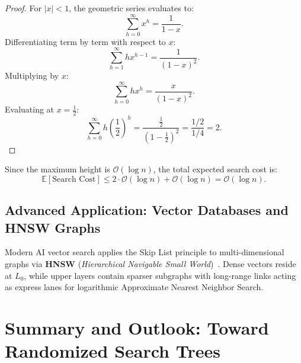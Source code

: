 \begin{proof}
For $|x| < 1$, the geometric series evaluates to:
\begin{equation}
  \sum_{h=0}^{\infty} x^h = \frac{1}{1 - x}.
\end{equation}
Differentiating term by term with respect to $x$:
\begin{equation}
  \sum_{h=1}^{\infty} h x^{h-1} = \frac{1}{(1 - x)^2}.
\end{equation}
Multiplying by $x$:
\begin{equation}
  \sum_{h=0}^{\infty} h x^h = \frac{x}{(1 - x)^2}.
\end{equation}
Evaluating at $x = \frac{1}{2}$:
\begin{equation}
  \sum_{h=0}^{\infty} h \left(\frac{1}{2}\right)^h = \frac{\frac{1}{2}}{\left(1 - \frac{1}{2}\right)^2} = \frac{1/2}{1/4} = 2.
\end{equation}
\end{proof}

Since the maximum height is $\mathcal{O}(\log n)$, the total expected search cost is:
\begin{equation}
  \mathbb{E}[\text{Search Cost}] \le 2 \cdot \mathcal{O}(\log n) + \mathcal{O}(\log n) = \mathcal{O}(\log n).
\end{equation}

\subsection{Advanced Application: Vector Databases and HNSW Graphs}
Modern AI vector search applies the Skip List principle to multi-dimensional graphs via \textbf{HNSW} (\textit{Hierarchical Navigable Small World})~\cite{malkov2020}. Dense vectors reside at $L_0$, while upper layers contain sparser subgraphs with long-range links acting as express lanes for logarithmic Approximate Nearest Neighbor Search.

\FloatBarrier
\section{Summary and Outlook: Toward Randomized Search Trees}
\label{sec:skip-list-conclusions-en}

